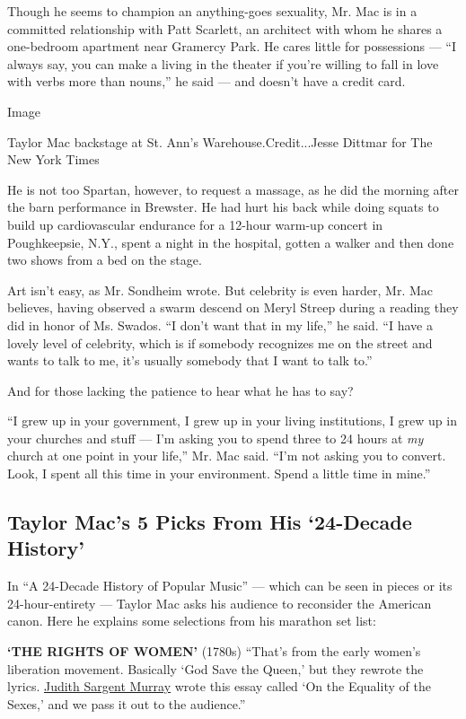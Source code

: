 Though he seems to champion an anything-goes sexuality, Mr. Mac is in a
committed relationship with Patt Scarlett, an architect with whom he
shares a one-bedroom apartment near Gramercy Park. He cares little for
possessions --- ``I always say, you can make a living in the theater if
you're willing to fall in love with verbs more than nouns,'' he said ---
and doesn't have a credit card.

Image

Taylor Mac backstage at St. Ann's Warehouse.Credit...Jesse Dittmar for
The New York Times

He is not too Spartan, however, to request a massage, as he did the
morning after the barn performance in Brewster. He had hurt his back
while doing squats to build up cardiovascular endurance for a 12-hour
warm-up concert in Poughkeepsie, N.Y., spent a night in the hospital,
gotten a walker and then done two shows from a bed on the stage.

Art isn't easy, as Mr. Sondheim wrote. But celebrity is even harder, Mr.
Mac believes, having observed a swarm descend on Meryl Streep during a
reading they did in honor of Ms. Swados. ``I don't want that in my
life,'' he said. ``I have a lovely level of celebrity, which is if
somebody recognizes me on the street and wants to talk to me, it's
usually somebody that I want to talk to.''

And for those lacking the patience to hear what he has to say?

``I grew up in your government, I grew up in your living institutions, I
grew up in your churches and stuff --- I'm asking you to spend three to
24 hours at \emph{my} church at one point in your life,'' Mr. Mac said.
``I'm not asking you to convert. Look, I spent all this time in your
environment. Spend a little time in mine.''

\hypertarget{taylor-macs-5-picks-from-his-24-decade-history}{%
\subsection{Taylor Mac's 5 Picks From His `24-Decade
History'}\label{taylor-macs-5-picks-from-his-24-decade-history}}

In ``A 24-Decade History of Popular Music'' --- which can be seen in
pieces or its 24-hour-entirety --- Taylor Mac asks his audience to
reconsider the American canon. Here he explains some selections from his
marathon set list:

\textbf{`THE RIGHTS OF WOMEN'} (1780s) ``That's from the early women's
liberation movement. Basically `God Save the Queen,' but they rewrote
the lyrics.
\href{https://www.nwhm.org/education-resources/biography/biographies/judith-sargent-murray/}{Judith
Sargent Murray} wrote this essay called `On the Equality of the Sexes,'
and we pass it out to the audience.''

